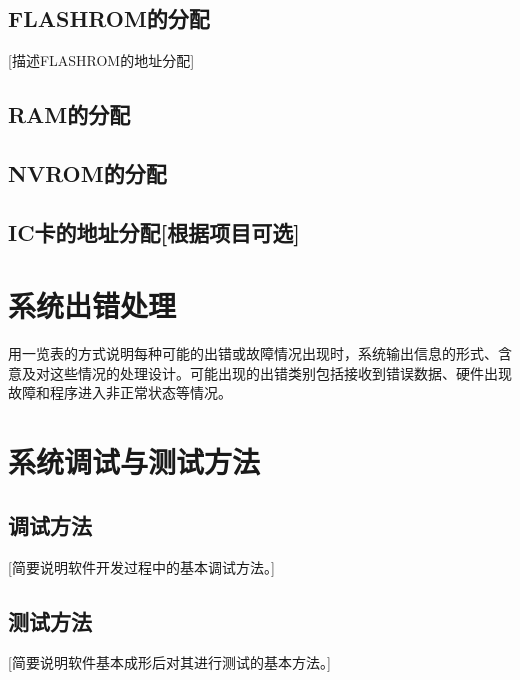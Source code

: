 \documentclass[UTF8]{ctexart}
\begin{document}
      	\subsection{FLASHROM的分配}
		[描述FLASHROM的地址分配]
	\subsection{RAM的分配}
	\subsection{NVROM的分配}
	\subsection{IC卡的地址分配[根据项目可选]}
\section{系统出错处理}
	用一览表的方式说明每种可能的出错或故障情况出现时，系统输出信息的形式、含意及对这些情况的处理设计。可能出现的出错类别包括接收到错误数据、硬件出现故障和程序进入非正常状态等情况。
\section{系统调试与测试方法}
	\subsection{调试方法}
		[简要说明软件开发过程中的基本调试方法。]
	\subsection{测试方法}
		[简要说明软件基本成形后对其进行测试的基本方法。]
\end{document}
